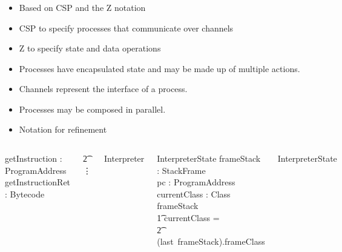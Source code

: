 \documentclass{beamer}
\begin{document}
\begin{frame}
  \frametitle{\Circus{}}
  \scriptsize
  \begin{itemize}
  \item Based on CSP and the Z notation
  \item CSP to specify processes that communicate over channels
  \item Z to specify state and data operations
  \item Processes have encapsulated state and may be made up of
    multiple actions.
  \item Channels represent the interface of a process.
  \item Processes may be composed in parallel.
  \item Notation for refinement
  \end{itemize}
  \begin{columns}[T]
    \tiny
    \setlength{\zedindent}{0cm}
    \setlength{\zedleftsep}{0.1cm}
    \setlength{\zedtab}{0.5cm}
    \setlength{\abovedisplayskip}{0cm}
    \setlength{\abovedisplayshortskip}{0cm}
    \setlength{\belowdisplayskip}{0cm}
    \setlength{\belowdisplayshortskip}{0cm}
  \begin{circus}
    \circchannel getInstruction : ProgramAddress \\
    \circchannel getInstructionRet : Bytecode \\
  \end{circus}
  \vspace{-0.6cm}
  \begin{circus}
    \t2 \vdots
  \end{circus}
  \begin{circus}
    \circprocess Interpreter \circdef \circbegin
  \end{circus}
  \begin{schema}{InterpreterState}
    frameStack : \seq StackFrame \\
    pc : ProgramAddress \\
    currentClass : Class
  \where
  frameStack \neq \emptyset \implies \\
  \t1 currentClass = \\
  \t2 (last~frameStack).frameClass
  \end{schema}
  \begin{circusaction}
    \circstate InterpreterState
  \end{circusaction}

\end{columns}
\end{frame}
\end{document}

